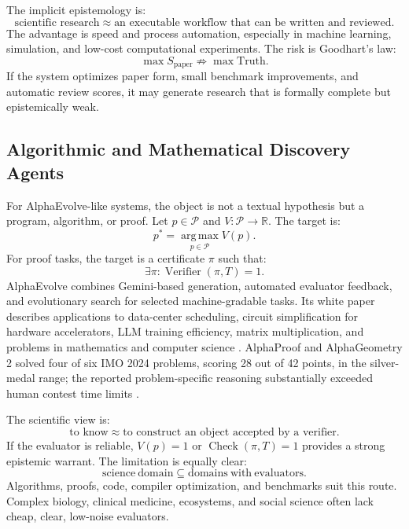 \documentclass[11pt,a4paper]{article}
\newcommand{\argmax}{\operatorname*{arg\,max}}
\begin{document}
The implicit epistemology is:
\[
\boxed{\text{scientific research} \approx \text{an executable workflow that can be written and reviewed}.}
\]
The advantage is speed and process automation, especially in machine learning, simulation, and low-cost computational experiments. The risk is Goodhart's law:
\begin{equation}
\max S_{\mathrm{paper}}\not\Rightarrow \max \mathrm{Truth}.
\end{equation}
If the system optimizes paper form, small benchmark improvements, and automatic review scores, it may generate research that is formally complete but epistemically weak.

\subsection{Algorithmic and Mathematical Discovery Agents}

For AlphaEvolve-like systems, the object is not a textual hypothesis but a program, algorithm, or proof. Let $p\in\mathcal{P}$ and $V:\mathcal{P}\rightarrow\mathbb{R}$. The target is:
\begin{equation}
p^\ast=\argmax_{p\in\mathcal{P}} V(p).
\end{equation}
For proof tasks, the target is a certificate $\pi$ such that:
\begin{equation}
\exists\pi:\operatorname{Verifier}(\pi,T)=1.
\end{equation}
AlphaEvolve combines Gemini-based generation, automated evaluator feedback, and evolutionary search for selected machine-gradable tasks. Its white paper describes applications to data-center scheduling, circuit simplification for hardware accelerators, LLM training efficiency, matrix multiplication, and problems in mathematics and computer science \citep{Novikov2025AlphaEvolve}. AlphaProof and AlphaGeometry 2 solved four of six IMO 2024 problems, scoring 28 out of 42 points, in the silver-medal range; the reported problem-specific reasoning substantially exceeded human contest time limits \citep{Hubert2026AlphaProof}.

The scientific view is:
\[
\boxed{\text{to know} \approx \text{to construct an object accepted by a verifier}.}
\]
If the evaluator is reliable, $V(p)=1$ or $\operatorname{Check}(\pi,T)=1$ provides a strong epistemic warrant. The limitation is equally clear:
\[
\mathrm{science\ domain}\subseteq \mathrm{domains\ with\ evaluators}.
\]
Algorithms, proofs, code, compiler optimization, and benchmarks suit this route. Complex biology, clinical medicine, ecosystems, and social science often lack cheap, clear, low-noise evaluators.
\end{document}
